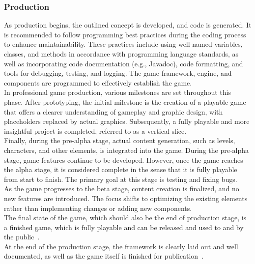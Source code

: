 \subsubsection{Production}\label{subsubsec:production}
As production begins, the outlined concept is developed, and code is generated.
It is recommended to follow programming best practices during the coding process to enhance maintainability.
These practices include using well-named variables, classes, and methods in accordance with programming language standards,
as well as incorporating code documentation (e.g., Javadoc), code formatting, and tools for debugging, testing, and logging.
The game framework, engine, and components are programmed to effectively establish the game.
\\
In professional game production, various milestones are set throughout this phase.
After prototyping, the initial milestone is the creation of a playable game that offers a clearer understanding of gameplay
and graphic design, with placeholders replaced by actual graphics.
Subsequently, a fully playable and more insightful project is completed, referred to as a vertical slice.
\\
Finally, during the pre-alpha stage, actual content generation, such as levels, characters, and other elements, is integrated into the game.
During the pre-alpha stage, game features continue to be developed.
However, once the game reaches the alpha stage,
it is considered complete in the sense that it is fully playable from start to finish.
The primary goal at this stage is testing and fixing bugs.
\\
As the game progresses to the beta stage, content creation is finalized, and no new features are introduced.
The focus shifts to optimizing the existing elements rather than implementing changes or adding new components.
\\
The final state of the game, which should also be the end of production stage, is a finished game, which is fully playable and can be
released and used to and by the public~\cite{cg:game-design-stages}.
\\
At the end of the production stage, the framework is clearly laid out and well documented, as well as the game itself is finished for publication~\cite{GAMED}.

